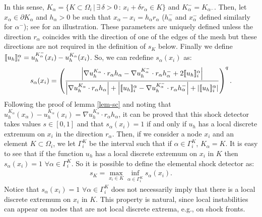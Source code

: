 In this sense, $K_\alpha = \{K\subset \Omega_i \, | \, \exists \, \delta>0 \, : \, x_i+\delta r_\alpha\in K\}$ and $K_\alpha^- = K_{\alpha^-}$. Then, let $x_\alpha\in \partial K_\alpha$ and $h_\alpha>0$ be such that $x_\alpha-x_i=h_\alpha r_\alpha$ ($h_\alpha^-$ and $x_\alpha^-$ defined similarly for $\alpha^-$); see  for an illustration. These parameters are uniquely defined unless the direction $r_\alpha$ coincides with the direction of one of the edges of the mesh but these directions are not required in the definition of $s_K$ below. %
Finally we define $\lbrack\!\lbrack u_h \rbrack\!\rbrack_i^\alpha = u_h^{K_\alpha^-}(x_i) - u_h^{K_\alpha}(x_i)$. So,  we can redefine $s_\alpha(x_i)$ as:
\begin{align*}
s_\alpha(x_i) = \left(\frac{\left|\nabla u_h^{K_\alpha} \cdot r_\alpha h_\alpha -\nabla u_h^{K_\alpha^-} \cdot r_\alpha h^-_{\alpha}+2\lbrack\!\lbrack u_h \rbrack\!\rbrack_i^\alpha\right|}{\left|\nabla u_h^{K_\alpha} \cdot r_\alpha h_\alpha  \right|+ \left| \lbrack\!\lbrack u_h \rbrack\!\rbrack_i^\alpha - \nabla u_h^{K_\alpha^-} \cdot r_\alpha h^-_{\alpha}  \right|+ \left|\lbrack\!\lbrack u_h \rbrack\!\rbrack^\alpha_i\right|}\right)^q.
\end{align*}
Following the proof of lemma \ref{lem-sc} and noting that $u_h^{K_\alpha}(x_\alpha)-u_h^{K_\alpha}(x_i)=\nabla u_h^{K_\alpha} \cdot r_\alpha h_\alpha$, it can be proved that this shock detector takes values $s\in[0,1]$ and that $s_\alpha(x_i)=1$ if and only if $u_h$ has a local discrete extremum on $x_i$ in the direction $r_\alpha$. Then, if we consider a node $x_i$ and an element $K\subset\Omega_i$, we let $\Gamma_i^K$ be the interval such that if $\alpha\in\Gamma_i^K$, $K_\alpha=K$. It is easy to see that if the function $u_h$ has a local discrete extremum on $x_i$ in $K$ then $s_\alpha(x_i)=1$ $\forall\alpha\in\Gamma_i^K$. So it is possible to define the elemental shock detector as:
\begin{align*}
s_K = \max_{x_i\in K} \inf_{\alpha\in\Gamma_i^K} s_\alpha(x_i).
\end{align*}
Notice that $s_\alpha(x_i) = 1$ $\forall \alpha\in \Gamma_i^K$ does not necessarily imply that there is a local discrete extremum on $x_i$ in $K$. This property is natural, since local instabilities can appear on nodes that are not local discrete extrema, e.g., on shock fronts. 
 
